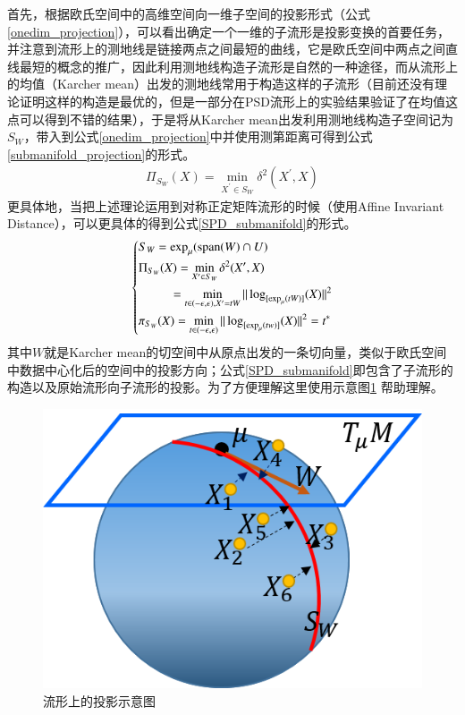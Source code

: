 首先，根据欧氏空间中的高维空间向一维子空间的投影形式（公式\ref{onedim_projection}），可以看出确定一个一维的子流形是投影变换的首要任务，并注意到流形上的测地线是链接两点之间最短的曲线，它是欧氏空间中两点之间直线最短的概念的推广，因此利用测地线构造子流形是自然的一种途径，而从流形上的均值（Karcher mean）出发的测地线常用于构造这样的子流形（目前还没有理论证明这样的构造是最优的，但是一部分在PSD流形上的实验结果验证了在均值这点可以得到不错的结果\cite{RegionCov_pedestrain}），于是将从Karcher mean出发利用测地线构造子空间记为$S_W$，带入到公式\ref{onedim_projection}中并使用测第距离可得到公式\ref{submanifold_projection}的形式。
\begin{equation}
\label{submanifold_projection}
\begin{split}
\Pi_{S_W}(X)=\min_{X^{\prime} \in S_W}\delta^{2}(X^{\prime},X)
\end{split}
\end{equation}
更具体地，当把上述理论运用到对称正定矩阵流形的时候（使用Affine Invariant Distance\cite{AIM_metric}），可以更具体的得到公式\ref{SPD_submanifold}的形式。
\begin{equation}
\label{SPD_submanifold}
\left\{
\begin{split}
\begin{aligned}
&S_W=\exp_\mu({\rm{span}}(W)\cap U)\\
&\Pi_{S_W}(X)=\min_{X^{\prime} \in S_W}\delta^{2}(X^{\prime},X)\\
&~~~~~~~~~~=\min_{t \in (-\epsilon,\epsilon),X^{\prime}=tW}\|\log_{[\exp_{\mu}(tW)]}(X)\|^2\\
&\pi_{S_W}(X)=\min_{t \in (-\epsilon,\epsilon)}\|\log_{[\exp_{\mu}(tw)]}(X)\|^2=t^{*}
\end{aligned}
\end{split}
\right.
\end{equation}
其中$W$就是Karcher mean的切空间中从原点出发的一条切向量，类似于欧氏空间中数据中心化后的空间中的投影方向；公式\ref{SPD_submanifold}即包含了子流形的构造以及原始流形向子流形的投影。为了方便理解这里使用示意图\ref{fig:SPD_SubManifold}
帮助理解。
\begin{figure}
	\centering
	\includegraphics[width=0.5\linewidth]{source/SPD_submanifold.png}
	\caption{流形上的投影示意图}
	\label{fig:SPD_SubManifold}
\end{figure}
